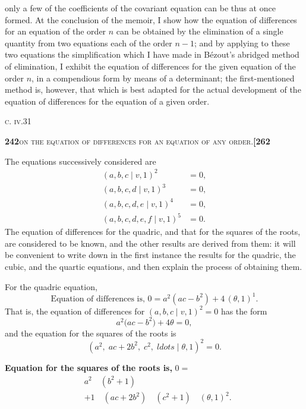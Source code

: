 \documentclass[11pt]{article}
\newcommand{\Cdel}{\mid}
\begin{document}
only a few of the coefficients of the covariant equation can be thus at once formed. At the conclusion of the memoir, I show how the equation of differences for an equation of the order $n$ can be obtained by the elimination of a single quantity from two equations each of the order $n - 1$; and by applying to these two equations the simplification which I have made in B\'ezout's abridged method of elimination, I exhibit the equation of differences for the given equation of the order $n$, in a compendious form by means of a determinant; the first-mentioned method is, however, that which is best adapted for the actual development of the equation of differences for the equation of a given order.

\medskip

\hfill {\footnotesize\textsc{c. iv.}\hfill 31}

\newpage
\noindent\textbf{242}\hfill\textsc{on the equation of differences for an equation of any order.}\hfill\textbf{[262}

\medskip

\noindent The equations successively considered are
\[
\begin{aligned}
  (a, b, c \Cdel v, 1)^2 &= 0,\\
  (a, b, c, d \Cdel v, 1)^3 &= 0,\\
  (a, b, c, d, e \Cdel v, 1)^4 &= 0,\\
  (a, b, c, d, e, f \Cdel v, 1)^5 &= 0.
\end{aligned}
\]
The equation of differences for the quadric, and that for the squares of the roots, are considered to be known, and the other results are derived from them: it will be convenient to write down in the first instance the results for the quadric, the cubic, and the quartic equations, and then explain the process of obtaining them.

\medskip

\noindent For the quadric equation,
\[
  \text{Equation of differences is, } 0 = a^2(ac - b^2) + 4\,(\theta, 1)^1.
\]
That is, the equation of differences for $(a, b, c \Cdel v, 1)^2 = 0$ has the form
\[
  a^2\bigl(ac - b^2\bigr) + 4\theta = 0,
\]
and the equation for the squares of the roots is
\[
  (a^2,\; ac + 2b^2,\; c^2,\; ldots \Cdel \theta, 1)^2 = 0.
\]

\medskip
\noindent\textbf{Equation for the squares of the roots is, } $0 = $
\[
\begin{aligned}
  & a^2\quad (b^2 + 1)\\
  & +1\quad (ac + 2b^2)\quad (c^2 + 1)\quad (\theta, 1)^2.
\end{aligned}
\]
\end{document}
